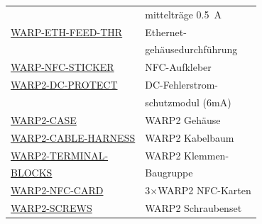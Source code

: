 \documentclass[a4paper,10pt]{article}
\begin{document}
\begin{multicols*}{2}
\begin{tabular}{ll}
		                                                                                                                            & mittelträge \SI{0,5}{\ampere}        \\
		\cmidrule(lr{0.5em}){1-2}
		\href{https://www.tinkerforge.com/de/shop/warp/warp2-spare-parts/warp-eth-feed-through.html}{WARP-ETH-FEED-THR}             & Ethernet-                            \\
		                                                                                                                            & gehäusedurchführung                  \\
		\cmidrule(lr{0.5em}){1-2}
		\href{https://www.tinkerforge.com/de/shop/warp/warp2-spare-parts/warp-nfc-sticker.html}{WARP-NFC-STICKER}                   & NFC-Aufkleber                        \\
		\cmidrule(lr{0.5em}){1-2}
		\href{https://www.tinkerforge.com/de/shop/warp/warp2-spare-parts/warp2-dc-protect.html}{WARP2-DC-PROTECT}                   & DC-Fehlerstrom-                      \\
		                                                                                                                            & schutzmodul (6mA)                    \\
		\cmidrule(lr{0.5em}){1-2}
		\href{https://www.tinkerforge.com/de/shop/warp/warp2-spare-parts.html}{WARP2-CASE}                                          & WARP2 Gehäuse                        \\
		\cmidrule(lr{0.5em}){1-2}
		\small{\href{https://www.tinkerforge.com/de/shop/warp/warp2-spare-parts/warp2-cable-harness.html}{WARP2-CABLE-HARNESS}}     & WARP2 Kabelbaum                      \\
		\cmidrule(lr{0.5em}){1-2}
		\href{https://www.tinkerforge.com/de/shop/warp/warp2-spare-parts/warp2-terminal-blocks.html}{WARP2-TERMINAL-}               & WARP2 Klemmen-                       \\
		\href{https://www.tinkerforge.com/de/shop/warp/warp2-spare-parts/warp2-terminal-blocks.html}{BLOCKS}                        & Baugruppe                            \\
		\cmidrule(lr{0.5em}){1-2}
		\href{https://www.tinkerforge.com/de/shop/warp/warp2-spare-parts/warp2-nfc-karte.html}{WARP2-NFC-CARD}                      & 3$\times$WARP2 NFC-Karten            \\
		\cmidrule(lr{0.5em}){1-2}
		\href{https://www.tinkerforge.com/de/shop/warp/warp2-spare-parts/warp2-screws.html}{WARP2-SCREWS}                           & WARP2 Schraubenset                   \\

\end{tabular}
\end{multicols*}
\end{document}
